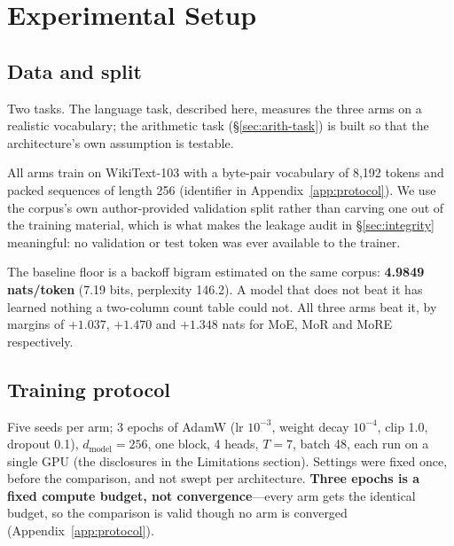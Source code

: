 \section{Experimental Setup}
\label{sec:setup}

\subsection{Data and split}
\label{sec:data}

Two tasks. The language task, described here, measures the three arms on a
realistic vocabulary; the arithmetic task (\S\ref{sec:arith-task}) is built so
that the architecture's own assumption is testable.

All arms train on WikiText-103 \citep{merity2017wikitext} with a byte-pair
vocabulary of 8{,}192 tokens and packed sequences of length 256
(identifier in Appendix~\ref{app:protocol}). We use the corpus's own
author-provided validation split rather than carving one out of the training
material, which is what makes the leakage audit in \S\ref{sec:integrity}
meaningful: no validation or test token was ever available to the trainer.

The baseline floor is a backoff bigram estimated on the same corpus:
\textbf{4.9849 nats/token} (7.19 bits, perplexity 146.2). A model that does not
beat it has learned nothing a two-column count table could not. All three arms
beat it, by margins of $+1.037$, $+1.470$ and $+1.348$ nats for MoE, MoR and MoRE
respectively.

\subsection{Training protocol}\label{sec:protocol} Five seeds per arm; 3 epochs of AdamW (lr $10^{-3}$, weight decay $10^{-4}$, clip 1.0, dropout 0.1), $d_{\text{model}}=256$, one block, 4 heads, $T=7$, batch 48, each run on a single GPU (the disclosures in the Limitations section). Settings were fixed once, before the comparison, and not swept per architecture. \textbf{Three epochs is a fixed compute budget, not convergence}---every arm gets the identical budget, so the comparison is valid though no arm is converged (Appendix~\ref{app:protocol}).
